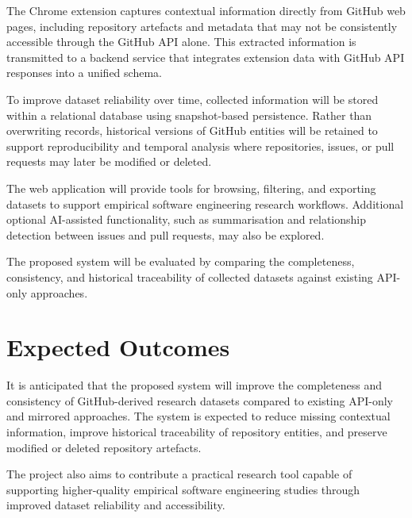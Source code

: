\documentclass[conference]{IEEEtran}
\begin{document}
The Chrome extension captures contextual information directly from GitHub web pages, including repository artefacts and metadata that may not be consistently accessible through the GitHub API alone. This extracted information is transmitted to a backend service that integrates extension data with GitHub API responses into a unified schema.

To improve dataset reliability over time, collected information will be stored within a relational database using snapshot-based persistence. Rather than overwriting records, historical versions of GitHub entities will be retained to support reproducibility and temporal analysis where repositories, issues, or pull requests may later be modified or deleted.

The web application will provide tools for browsing, filtering, and exporting datasets to support empirical software engineering research workflows. Additional optional AI-assisted functionality, such as summarisation and relationship detection between issues and pull requests, may also be explored.

The proposed system will be evaluated by comparing the completeness, consistency, and historical traceability of collected datasets against existing API-only approaches.

\section{Expected Outcomes}
It is anticipated that the proposed system will improve the completeness and consistency of GitHub-derived research datasets compared to existing API-only and mirrored approaches. The system is expected to reduce missing contextual information, improve historical traceability of repository entities, and preserve modified or deleted repository artefacts.

The project also aims to contribute a practical research tool capable of supporting higher-quality empirical software engineering studies through improved dataset reliability and accessibility.
\end{document}
